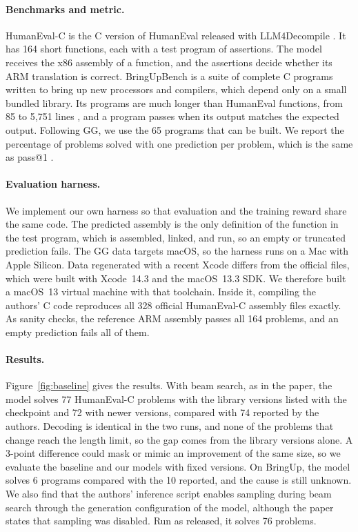 \documentclass{article}
\begin{document}
\paragraph{Benchmarks and metric.}
HumanEval-C is the C version of HumanEval \citep{humaneval} released with LLM4Decompile \citep{llm4decompile}. It has 164 short functions, each with a test program of assertions. The model receives the x86 assembly of a function, and the assertions decide whether its ARM translation is correct. BringUpBench \citep{bringupbench} is a suite of complete C programs written to bring up new processors and compilers, which depend only on a small bundled library. Its programs are much longer than HumanEval functions, from 85 to 5{,}751 lines \citep{gg}, and a program passes when its output matches the expected output. Following GG, we use the 65 programs that can be built. We report the percentage of problems solved with one prediction per problem, which is the same as pass@1 \citep{humaneval}.

\paragraph{Evaluation harness.}
We implement our own harness so that evaluation and the training reward share the same code. The predicted assembly is the only definition of the function in the test program, which is assembled, linked, and run, so an empty or truncated prediction fails. The GG data targets macOS, so the harness runs on a Mac with Apple Silicon. Data regenerated with a recent Xcode differs from the official files, which were built with Xcode~14.3 and the macOS~13.3 SDK. We therefore built a macOS~13 virtual machine with that toolchain. Inside it, compiling the authors' C code reproduces all 328 official HumanEval-C assembly files exactly. As sanity checks, the reference ARM assembly passes all 164 problems, and an empty prediction fails all of them.

\paragraph{Results.}
Figure~\ref{fig:baseline} gives the results. With beam search, as in the paper, the model solves 77 HumanEval-C problems with the library versions listed with the checkpoint and 72 with newer versions, compared with 74 reported by the authors. Decoding is identical in the two runs, and none of the problems that change reach the length limit, so the gap comes from the library versions alone. A 3-point difference could mask or mimic an improvement of the same size, so we evaluate the baseline and our models with fixed versions. On BringUp, the model solves 6 programs compared with the 10 reported, and the cause is still unknown. We also find that the authors' inference script enables sampling during beam search through the generation configuration of the model, although the paper states that sampling was disabled.  Run as released, it solves 76 problems. 
\end{document}
